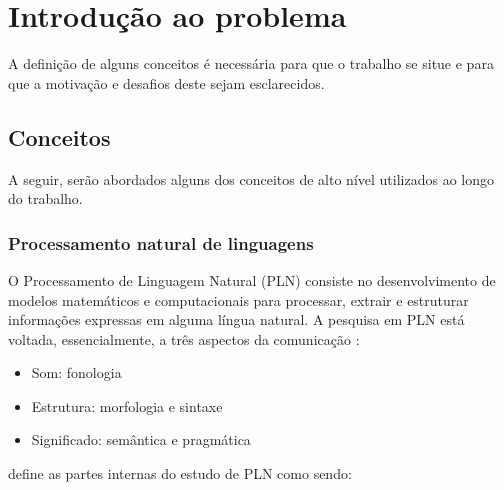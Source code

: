 \chapter{Introdução ao problema} \label{c:introducao_ao_problema}

A definição de alguns conceitos é necessária para que o trabalho se situe e para que a motivação e desafios deste sejam esclarecidos.

\section{Conceitos} \label{s:conceitos}

A seguir, serão abordados alguns dos conceitos de alto nível utilizados ao longo do trabalho.

\subsection{Processamento natural de linguagens} \label{ss:processamento_natural_de_linguagens}

O Processamento de Linguagem Natural (PLN) consiste no desenvolvimento de modelos matemáticos e computacionais para processar, extrair e estruturar informações expressas em alguma língua natural. A pesquisa em PLN está voltada, essencialmente, a três aspectos da comunicação \cite{doprocessamento}:
\begin{itemize}
\item  Som: fonologia
\item  Estrutura: morfologia e sintaxe
\item  Significado: semântica e pragmática
\end{itemize}

 define as partes internas do estudo de PLN como sendo:

\begin{quote}
\end{quote}

